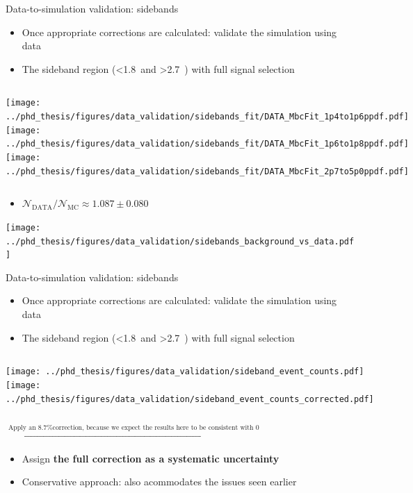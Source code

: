 \documentclass[xcolor=dvipsnames]{beamer}
\begin{document}
\begin{frame}{Data-to-simulation validation: sidebands}
   \scriptsize\centering
   \begin{itemize}
      \item Once appropriate corrections are calculated: validate the simulation using data
      \item The sideband region (\EB<1.8~\gev and \EB>2.7~\gev) with full signal selection
   \end{itemize}

   \begin{columns}
      \centering
      \texttt{[image: ../phd\_thesis/figures/data\_validation/sidebands\_fit/DATA\_MbcFit\_1p4to1p6ppdf.pdf]}
      \centering
      \texttt{[image: ../phd\_thesis/figures/data\_validation/sidebands\_fit/DATA\_MbcFit\_1p6to1p8ppdf.pdf]}
      \centering
      \texttt{[image: ../phd\_thesis/figures/data\_validation/sidebands\_fit/DATA\_MbcFit\_2p7to5p0ppdf.pdf]}
   \end{columns}

   \begin{itemize}
      \item $\mathcal{N}_{\mathrm{DATA}}/\mathcal{N}_{\mathrm{MC}}\approx 1.087\pm 0.080$
   \end{itemize}

   \texttt{[image: ../phd\_thesis/figures/data\_validation/sidebands\_background\_vs\_data.pdf]}

\end{frame}
\begin{frame}{Data-to-simulation validation: sidebands}
   \scriptsize\centering
   \begin{itemize}
      \item Once appropriate corrections are calculated: validate the simulation using data
      \item The sideband region (\EB<1.8~\gev and \EB>2.7~\gev) with full signal selection
   \end{itemize}

   \begin{columns}
      \centering
      \texttt{[image: ../phd\_thesis/figures/data\_validation/sideband\_event\_counts.pdf]}
    \centering
     \texttt{[image: ../phd\_thesis/figures/data\_validation/sideband\_event\_counts\_corrected.pdf]}
   \end{columns}

   $\xrightarrow{\text{Apply an 8.7\% correction, because we expect the results here to be consistent with 0}}$

   \begin{itemize}
      \item Assign \textbf{the full correction as a systematic uncertainty}
      \item[\ra] Conservative approach: also acommodates the issues seen earlier
   \end{itemize}

\end{frame}
\end{document}
